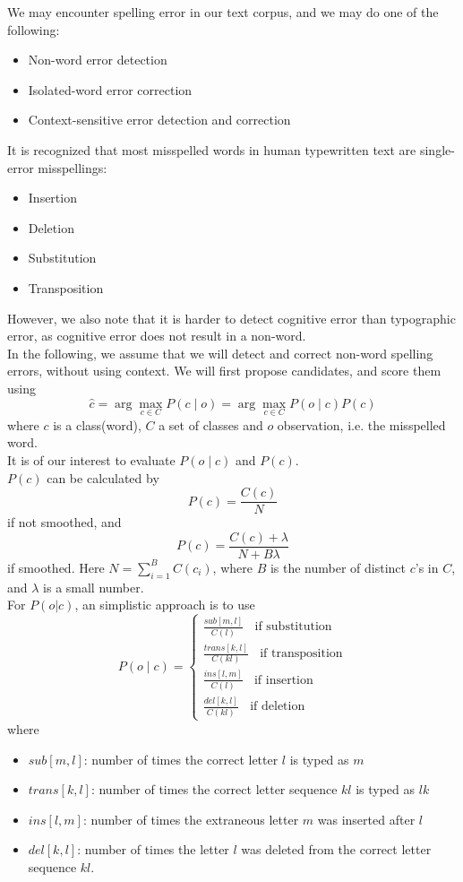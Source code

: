 \documentclass[12pt]{article}
\theoremstyle{definition}
\begin{document}
We may encounter spelling error in our text corpus, and we may do one of the following:
\begin{itemize}
	\item Non-word error detection
	\item Isolated-word error correction
	\item Context-sensitive error detection and correction
\end{itemize}
It is recognized that most misspelled words in human typewritten text are single-error misspellings:
\begin{itemize}
	\item Insertion
	\item Deletion
	\item Substitution
	\item Transposition
\end{itemize}
However, we also note that it is harder to detect cognitive error than typographic error, as cognitive error does not result in a non-word. \\
In the following, we assume that we will detect and correct non-word spelling errors, without using context. We will first propose candidates, and score them using
\[
\hat{c}=\arg\max_{c\in C}P(c\mid o)=\arg\max_{c\in C}P(o\mid c)P(c)
\]
where $c$ is a class(word), $C$ a set of classes and $o$ observation, i.e. the misspelled word. \\
It is of our interest to evaluate $P(o\mid c)$ and $P(c)$.\\
$P(c)$ can be calculated by 
\[
P(c)=\frac{C(c)}{N}
\]
if not smoothed, and
\[
P(c)=\frac{C(c)+\lambda}{N+B\lambda}
\]
if smoothed. Here $N=\sum_{i=1}^B C(c_i)$, where $B$ is the number of distinct $c$'s in $C$, and $\lambda$ is a small number. \\
For $P(o|c)$, an simplistic approach is to use 
\[
P(o\mid c)=\begin{cases}
\frac{\textit{sub}[m,l]}{C(l)}\;\;\text{ if substitution}\\
\frac{\textit{trans}[k,l]}{C(kl)}\;\;\text{ if transposition}\\
\frac{\textit{ins}[l,m]}{C(l)}\;\;\text{ if insertion}\\
\frac{\textit{del}[k,l]}{C(kl)}\;\;\text{ if deletion}
\end{cases}
\]
where
\begin{itemize}
	\item $\textit{sub}[m,l]$: number of times the correct letter $l$ is typed as $m$
	\item $\textit{trans}[k,l]$: number of times the correct letter sequence $kl$ is typed as $lk$
	\item $\textit{ins}[l,m]$: number of times the extraneous letter $m$ was inserted after $l$
	\item $\textit{del}[k,l]$: number of times the letter $l$ was deleted from the correct letter sequence $kl$.
\end{itemize}
\end{document}
